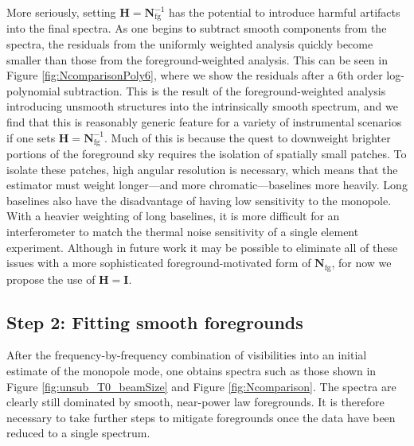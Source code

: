 \documentclass[twocolumn,apj,numberedappendix]{emulateapj}
\newcommand{\Hmat}{\mathbf{H}}
\newcommand{\Nfg}{\mathbf{N}_{\textrm{fg}}}
\begin{document}
More seriously, setting $\Hmat = \Nfg^{-1}$ has the potential to introduce harmful artifacts into the final spectra. As one begins to subtract smooth components from the spectra, the residuals from the uniformly weighted analysis quickly become smaller than those from the foreground-weighted analysis. This can be seen in Figure \ref{fig:NcomparisonPoly6}, where we show the residuals after a $6$th order log-polynomial subtraction. This is the result of the foreground-weighted analysis introducing unsmooth structures into the intrinsically smooth spectrum, and we find that this is reasonably generic feature for a variety of instrumental scenarios if one sets $\Hmat = \Nfg^{-1}$. Much of this is because the quest to downweight brighter portions of the foreground sky requires the isolation of spatially small patches. To isolate these patches, high angular resolution is necessary, which means that the estimator must weight longer---and more chromatic---baselines more heavily. Long baselines also have the disadvantage of having low sensitivity to the monopole. With a heavier weighting of long baselines, it is more difficult for an interferometer to match the thermal noise sensitivity of a single element experiment. Although in future work it may be possible to eliminate all of these issues with a more sophisticated foreground-motivated form of $\Nfg$, for now we propose the use of $\Hmat = \mathbf{I}$.

\subsection{Step 2: Fitting smooth foregrounds}
\label{sec:fitting}
After the frequency-by-frequency combination of visibilities into an initial estimate of the monopole mode, one obtains spectra such as those shown in Figure \ref{fig:unsub_T0_beamSize} and Figure \ref{fig:Ncomparison}. The spectra are clearly still dominated by smooth, near-power law foregrounds. It is therefore necessary to take further steps to mitigate foregrounds once the data have been reduced to a single spectrum.
\end{document}
